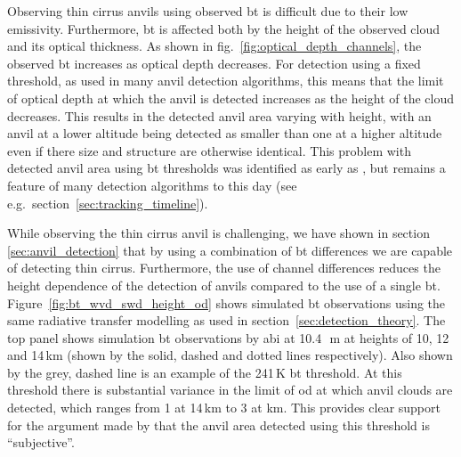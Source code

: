 Observing thin cirrus anvils using observed \acrshort{bt} is difficult due to their low emissivity.
Furthermore, \acrshort{bt} is affected both by the height of the observed cloud and its optical thickness.
As shown in fig.~\ref{fig:optical_depth_channels}, the observed \acrshort{bt} increases as optical depth decreases.
For detection using a fixed threshold, as used in many anvil detection algorithms, this means that the limit of optical depth at which the anvil is detected increases as the height of the cloud decreases.
This results in the detected anvil area varying with height, with an anvil at a lower altitude being detected as smaller than one at a higher altitude even if there size and structure are otherwise identical.
This problem with detected anvil area using \acrshort{bt} thresholds was identified as early as \citet{augustine_mesoscale_1988}, but remains a feature of many detection algorithms to this day (see e.g.\ section~\ref{sec:tracking_timeline}).

While observing the thin cirrus anvil is challenging, we have shown in section \ref{sec:anvil_detection} that by using a combination of \acrshort{bt} differences we are capable of detecting thin cirrus.
Furthermore, the use of channel differences reduces the height dependence of the detection of anvils compared to the use of a single \acrshort{bt}.
Figure~\ref{fig:bt_wvd_swd_height_od} shows simulated \acrshort{bt} observations using the same radiative transfer modelling as used in section~\ref{sec:detection_theory}.
The top panel shows simulation \acrshort{bt} observations by \acrshort{abi} at 10.4\,\unit{\mu m} at heights of 10, 12 and 14\,\unit{km} (shown by the solid, dashed and dotted lines respectively).
Also shown by the grey, dashed line is an example of the 241\,\unit{K} \acrshort{bt} threshold.
At this threshold there is substantial variance in the limit of \acrshort{od} at which anvil clouds are detected, which ranges from 1 at 14\,\unit{km} to 3 at \unit{km}.
This provides clear support for the argument made by \citet{augustine_mesoscale_1988} that the anvil area detected using this threshold is ``subjective''.

